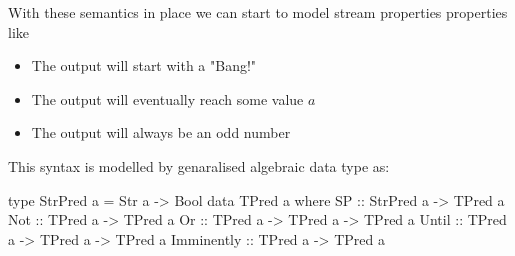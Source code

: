 With these semantics in place we can start to model stream properties properties like
\begin{itemize}
    \item The output will start with a "Bang!"
    \item The output will eventually reach some value $a$
    \item The output will always be an odd number
\end{itemize}


This syntax is modelled by genaralised algebraic data type as:
\begin{hscode}
type StrPred a = Str a -> Bool
data TPred a where
    SP          :: StrPred a -> TPred a
    Not         :: TPred a -> TPred a
    Or          :: TPred a -> TPred a -> TPred a
    Until       :: TPred a -> TPred a -> TPred a
    Imminently  :: TPred a -> TPred a
\end{hscode}